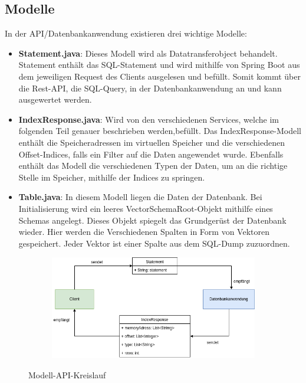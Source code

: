 \subsection{Modelle}
In der API/Datenbankanwendung existieren drei wichtige Modelle:

\begin{itemize}
 \item \textbf{Statement.java}: Dieses Modell wird als Datatransferobject behandelt. Statement enthält das SQL-Statement und wird mithilfe von Spring Boot aus dem jeweiligen Request des Clients ausgelesen und befüllt. Somit kommt über die Rest-API, die SQL-Query, in der Datenbankanwendung an und kann ausgewertet werden.
 \item \textbf{IndexResponse.java}: Wird von den verschiedenen Services, welche im folgenden Teil genauer beschrieben werden,befüllt. Das IndexResponse-Modell enthält die Speicheradressen im virtuellen Speicher und die verschiedenen Offset-Indices, falls ein Filter auf die Daten angewendet wurde. Ebenfalls enthält das Modell die verschiedenen Typen der Daten, um an die richtige Stelle im Speicher, mithilfe der Indices zu springen.
 \item \textbf{Table.java}: In diesem Modell liegen die Daten der Datenbank. Bei Initialisierung wird ein leeres VectorSchemaRoot-Objekt mithilfe eines Schemas angelegt. Dieses Objekt spiegelt das Grundgerüst der Datenbank wieder. Hier werden die Verschiedenen Spalten in Form von Vektoren gespeichert. Jeder Vektor ist einer Spalte aus dem SQL-Dump zuzuordnen.
\end{itemize}

\begin{figure}[h]
  \centering
  \begin{subfigure}[b]{1.0\textwidth}
    \includegraphics[width=1.0\linewidth]{img/sendrecieve}
  \end{subfigure}
  \caption{Modell-API-Kreislauf}
  \label{graf_2}
\end{figure}


